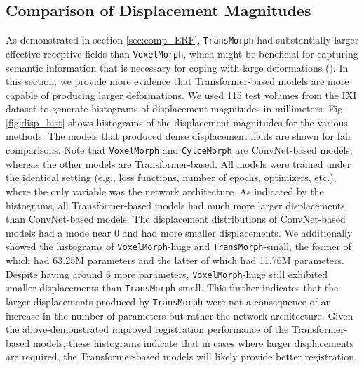 \documentclass[times,twocolumn,final]{elsarticle}
\begin{document}
\subsection{Comparison of Displacement Magnitudes}
As demonstrated in section \ref{sec:comp_ERF}, \texttt{TransMorph} had substantially larger effective receptive fields than \texttt{VoxelMorph}, which might be beneficial for capturing semantic information that is necessary for coping with large deformations (\cite{ha2020semantically}). In this section, we provide more evidence that Transformer-based models are more capable of producing larger deformations. We used 115 test volumes from the IXI dataset to generate histograms of displacement magnitudes in millimeters. Fig. \ref{fig:disp_hist} shows histograms of the displacement magnitudes for the various methods. The models that produced dense displacement fields are shown for fair comparisons.  Note that \texttt{VoxelMorph} and \texttt{CylceMorph} are ConvNet-based models, whereas the other models are Transformer-based. All models were trained under the identical setting (e.g., loss functions, number of epochs, optimizers, etc.), where the only variable was the network architecture. As indicated by the histograms, all Transformer-based models had much more larger displacements than ConvNet-based models. The displacement distributions of ConvNet-based models had a mode near 0 and had more smaller displacements. We additionally showed the histograms of \texttt{VoxelMorph}-huge and \texttt{TransMorph}-small, the former of which had 63.25M parameters and the latter of which had 11.76M parameters. Despite having around 6 more parameters, \texttt{VoxelMorph}-huge still exhibited smaller displacements than \texttt{TransMorph}-small. This further indicates that the larger displacements produced by \texttt{TransMorph} were not a consequence of an increase in the number of parameters but rather the network architecture. Given the above-demonstrated improved registration performance of the Transformer-based models, these histograms indicate that in cases where larger displacements are required, the Transformer-based models will likely provide better registration.
\end{document}
